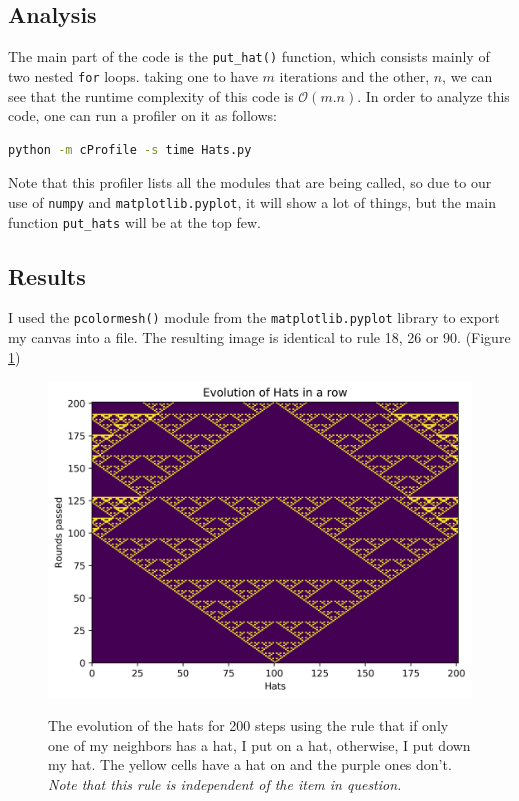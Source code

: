 \documentclass[12pt]{article}
\begin{document}
    \subsection{Analysis}
    The main part of the code is the \texttt{put\_hat()} function, which consists mainly of two
    nested \texttt{for} loops. taking one to have $m$ iterations and the other, $n$, we can see 
    that the runtime complexity of this code is $\mathcal{O}(m.n)$.
    In order to analyze this code, one can run a profiler on it as follows:
    \begin{lstlisting}[language=bash]
    	python -m cProfile -s time Hats.py
    \end{lstlisting}
	Note that this profiler lists all the modules that are being called, so due to our use of \texttt{numpy} and \texttt{matplotlib.pyplot}, it will show a lot of things, but the main 
	function \texttt{put\_hats} will be at the top few.
    
	
	\subsection{Results}
	I used the \texttt{pcolormesh()} module from the \texttt{matplotlib.pyplot} library to
	export my canvas into a file. The resulting image is identical to rule 18, 26 or 90. (Figure \ref{fig:hats200})
	\begin{figure}[h!]
		\includegraphics[width=\linewidth]{../P1/Hats200.jpg}
		\label{fig:hats200}
		\caption{The evolution of the hats for 200 steps using the rule that if only one of
							my neighbors has a hat, I put on a hat, otherwise, I put down my hat. The yellow cells have a hat on and the purple ones don't.
							\emph{Note that this rule is independent of the item in question.}}
	\end{figure}

	
	
\end{document}
